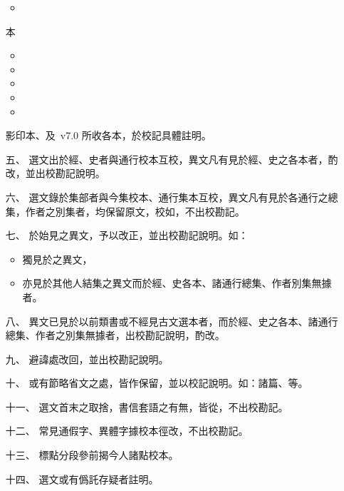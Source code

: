 \begin{enumerate}
\begin{itemize}
        \item {}
    \end{itemize}
    本
    \begin{itemize}
        \item {}
        \item {}
        \item {}
        \item {}
        \item {}
    \end{itemize}
    影印本、及\ v7.0 所收各本，於校記具體註明。
    \item[五、] 選文出於經、史者與通行校本互校，異文凡有見於經、史之各本者，酌改，並出校勘記說明。
    \item[六、] 選文錄於集部者與今集校本、通行集本互校，異文凡有見於各通行之總集，作者之別集者，均保留原文，校如，不出校勘記。
    \item[七、] 於始見之異文，予以改正，並出校勘記說明。如：\begin{itemize}
        \item 獨見於之異文，
        \item 亦見於其他人結集之異文而於經、史各本、諸通行總集、作者別集無據者。
    \end{itemize}
    \item[八、] 異文已見於以前類書或不經見古文選本者，而於經、史之各本、諸通行總集、作者之別集無據者，出校勘記說明，酌改。
    \item[九、] 避諱處改回，並出校勘記說明。
    \item[十、] 或有節略省文之處，皆作保留，並以校記說明。如：諸篇、等。
    \item[十一、] 選文首末之取捨，書信套語之有無，皆從，不出校勘記。
    \item[十二、] 常見通假字、異體字據校本徑改，不出校勘記。
    \item[十三、] 標點分段參前揭今人諸點校本。
    \item[十四、] 選文或有僞託存疑者註明。 
\end{enumerate}
  